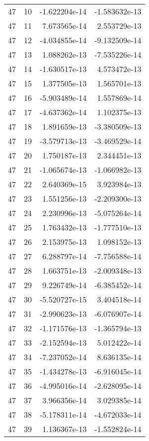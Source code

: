 \begin{tabular}{rrrr}
  47 &   10 & -1.622204e-14 & -1.583632e-13 \\
  47 &   11 &  7.673565e-14 &  2.553729e-13 \\
  47 &   12 & -4.034855e-14 & -9.132509e-14 \\
  47 &   13 &  1.088262e-13 & -7.535226e-14 \\
  47 &   14 & -1.630517e-13 &  4.573472e-13 \\
  47 &   15 &  1.377505e-13 &  1.565701e-13 \\
  47 &   16 & -5.903489e-14 &  1.557869e-14 \\
  47 &   17 & -4.637362e-14 &  1.102375e-13 \\
  47 &   18 &  1.891659e-13 & -3.380509e-13 \\
  47 &   19 & -3.579713e-13 & -3.469529e-14 \\
  47 &   20 &  1.750187e-13 &  2.344451e-13 \\
  47 &   21 & -1.065674e-13 & -1.066982e-13 \\
  47 &   22 &  2.640369e-15 &  3.923984e-13 \\
  47 &   23 &  1.551256e-13 & -2.209300e-13 \\
  47 &   24 &  2.230996e-13 & -5.075264e-14 \\
  47 &   25 &  1.763432e-13 & -1.777510e-13 \\
  47 &   26 &  2.153975e-13 &  1.098152e-13 \\
  47 &   27 &  6.288797e-14 & -7.756588e-14 \\
  47 &   28 &  1.663751e-13 & -2.009348e-13 \\
  47 &   29 &  9.226749e-14 & -6.385452e-14 \\
  47 &   30 & -5.520727e-15 &  3.404518e-14 \\
  47 &   31 & -2.990623e-13 & -6.076907e-14 \\
  47 &   32 & -1.171576e-13 & -1.365794e-13 \\
  47 &   33 & -2.152594e-13 &  5.012422e-14 \\
  47 &   34 & -7.237052e-14 &  8.636135e-14 \\
  47 &   35 & -1.434278e-13 & -6.916045e-14 \\
  47 &   36 & -4.995016e-14 & -2.628095e-14 \\
  47 &   37 &  3.966356e-14 &  3.029385e-14 \\
  47 &   38 & -5.178311e-14 & -4.672033e-14 \\
  47 &   39 &  1.136367e-13 & -1.552824e-14 \\

\end{tabular}
